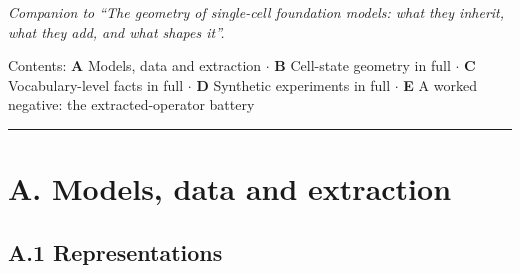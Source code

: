 \emph{Companion to ``The geometry of single-cell foundation models: what they inherit, what they add, and
what shapes it''.}

Contents:
\textbf{A} Models, data and extraction \(\cdot\)
\textbf{B} Cell-state geometry in full \(\cdot\)
\textbf{C} Vocabulary-level facts in full \(\cdot\)
\textbf{D} Synthetic experiments in full \(\cdot\)
\textbf{E} A worked negative: the extracted-operator battery

\begin{center}\rule{0.5\linewidth}{0.5pt}\end{center}

\hypertarget{a.-models-data-and-extraction}{%
\section{A. Models, data and extraction}\label{a.-models-data-and-extraction}}

\hypertarget{a.1-representations}{%
\subsection{A.1 Representations}\label{a.1-representations}}

